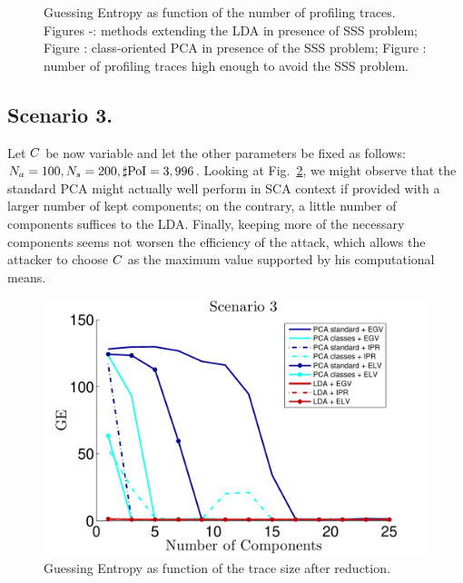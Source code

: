 \begin{figure}
\caption[Guessing Entropy as function of the number of profiling traces.]{Guessing Entropy as function of the number of profiling traces. Figures -: methods extending the LDA in presence of SSS problem; Figure : class-oriented PCA in presence of the SSS problem; Figure : number of profiling traces high enough to avoid the SSS problem.}\label{fig:scenario2}
\end{figure}


\subsection{Scenario 3.}
Let  $C$ be now variable and let the other parameters be fixed as follows: $N_a = 100, N_{s}=200, \sharp\mathrm{PoI} = 3,996$. Looking at Fig.~\ref{fig:3}, we might observe that the standard PCA might actually well perform in SCA context if provided with a larger number of kept components; on the contrary, a little number of components suffices to the LDA. Finally, keeping more of the necessary components seems not worsen the efficiency of the attack, which allows the attacker to choose $C$ as the maximum value supported by his computational means. 

\begin{figure}
\centering
\includegraphics[width=.5\textwidth]{../Figures/CARDIS2015/Criterion3.pdf}
\caption{Guessing Entropy as function of the trace size after reduction.}\label{fig:3}
\end{figure}

